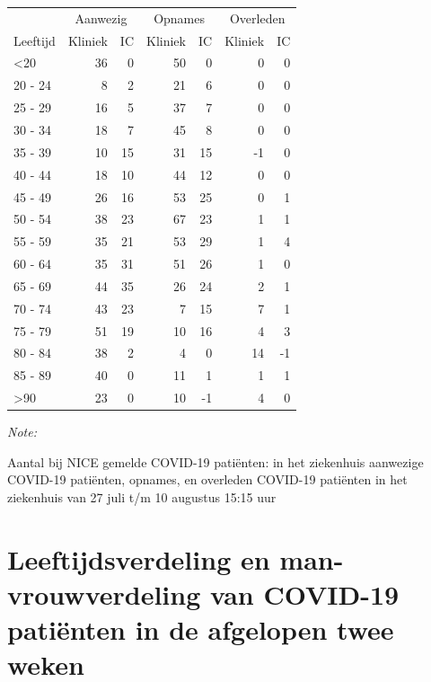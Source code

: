 \documentclass[
  english,
  man,floatsintext]{apa6}
\begin{document}
\begin{table}
\centering\begingroup\fontsize{10}{12}\selectfont

\begin{threeparttable}
\begin{tabular}{lrrrrrr}
\toprule
\multicolumn{1}{c}{ } & \multicolumn{2}{c}{Aanwezig} & \multicolumn{2}{c}{Opnames} & \multicolumn{2}{c}{Overleden} \\
\cmidrule(l{3pt}r{3pt}){2-3} \cmidrule(l{3pt}r{3pt}){4-5} \cmidrule(l{3pt}r{3pt}){6-7}
Leeftijd & Kliniek & IC & Kliniek & IC & Kliniek & IC\\
\midrule
<20 & 36 & 0 & 50 & 0 & 0 & 0\\
20 - 24 & 8 & 2 & 21 & 6 & 0 & 0\\
25 - 29 & 16 & 5 & 37 & 7 & 0 & 0\\
30 - 34 & 18 & 7 & 45 & 8 & 0 & 0\\
35 - 39 & 10 & 15 & 31 & 15 & -1 & 0\\
40 - 44 & 18 & 10 & 44 & 12 & 0 & 0\\
45 - 49 & 26 & 16 & 53 & 25 & 0 & 1\\
50 - 54 & 38 & 23 & 67 & 23 & 1 & 1\\
55 - 59 & 35 & 21 & 53 & 29 & 1 & 4\\
60 - 64 & 35 & 31 & 51 & 26 & 1 & 0\\
65 - 69 & 44 & 35 & 26 & 24 & 2 & 1\\
70 - 74 & 43 & 23 & 7 & 15 & 7 & 1\\
75 - 79 & 51 & 19 & 10 & 16 & 4 & 3\\
80 - 84 & 38 & 2 & 4 & 0 & 14 & -1\\
85 - 89 & 40 & 0 & 11 & 1 & 1 & 1\\
>90 & 23 & 0 & 10 & -1 & 4 & 0\\
\bottomrule
\end{tabular}
\begin{tablenotes}
\item \textit{Note: } 
\item Aantal bij NICE gemelde COVID-19 patiënten: in het ziekenhuis aanwezige COVID-19 patiënten, opnames, en overleden COVID-19 patiënten in het ziekenhuis van 27 juli t/m 10 augustus 15:15 uur
\end{tablenotes}
\end{threeparttable}
\endgroup{}
\end{table}

\newpage

\hypertarget{leeftijdsverdeling-en-man-vrouwverdeling-van-covid-19-patiuxebnten-in-de-afgelopen-twee-weken}{%
\section{Leeftijdsverdeling en man-vrouwverdeling van COVID-19 patiënten in de afgelopen twee weken}\label{leeftijdsverdeling-en-man-vrouwverdeling-van-covid-19-patiuxebnten-in-de-afgelopen-twee-weken}}
\end{document}
